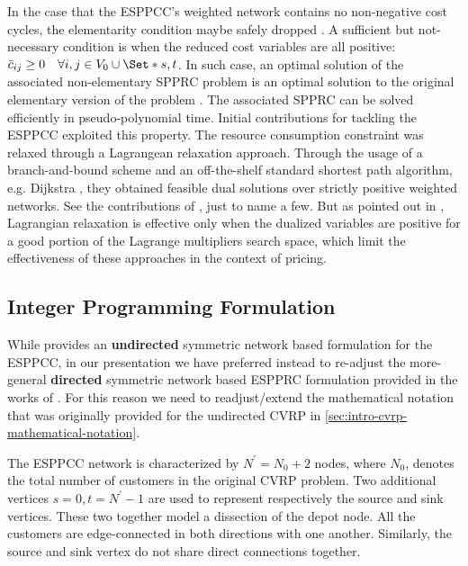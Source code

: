 \medskip

In the case that the ESPPCC's weighted network contains no non-negative
cost cycles, the elementarity condition maybe safely dropped \parencite{beasley1989}.
A sufficient but not-necessary condition is when the reduced cost variables
are all positive: $\bar{c}_{ij} \ge 0 \quad \forall i, j \in V_0 \cup \Set*{s, t}$.
In such case, an optimal solution of the associated non-elementary SPPRC problem
is an optimal solution to the original elementary version of the problem \parencite{beasley1989}.
The associated SPPRC can be solved efficiently in pseudo-polynomial time.
Initial contributions for tackling the ESPPCC exploited this property.
The resource consumption constraint was relaxed through a Lagrangean relaxation
approach.
Through the usage of a branch-and-bound scheme and an off-the-shelf
standard shortest path algorithm, e.g. Dijkstra \parencite{sniedovich2006dijkstra},
they obtained feasible dual solutions over strictly positive weighted networks.
See the contributions of
\textcite{beasley1989, dumitrescu2003improved, carlyle2008, muhandiramge2009simultaneous},
just to name a few.
But as pointed out in \textcite{righini2004},
Lagrangian relaxation is effective only when the dualized variables
are positive for a good portion of the Lagrange multipliers search space,
which limit the effectiveness of these approaches in the context of pricing.

\subsection{Integer Programming Formulation}
\label{sec:espprc-integer-programming-formulation}

While \textcite{jepsen2008branchandcut} provides
an \textbf{undirected} symmetric network based formulation for the ESPPCC,
in our presentation we have preferred instead to re-adjust the more-general
\textbf{directed} symmetric network based ESPPRC formulation
provided in the works of \textcite{beasley1989, toth2002, toth2014}.
For this reason we need to readjust/extend the
mathematical notation that was originally provided for the undirected CVRP in \cref{sec:intro-cvrp-mathematical-notation}.

\medskip

The ESPPCC network is characterized by $N^\prime = N_0 + 2$ nodes,
where $N_0$, denotes the total number of customers in the original CVRP problem.
Two additional vertices $s = 0, t = N^\prime - 1$ are used to represent respectively the source and sink vertices.
These two together model a dissection of the depot node.
All the customers are edge-connected in both directions with one another.
Similarly, the source and sink vertex do not share direct connections together.

